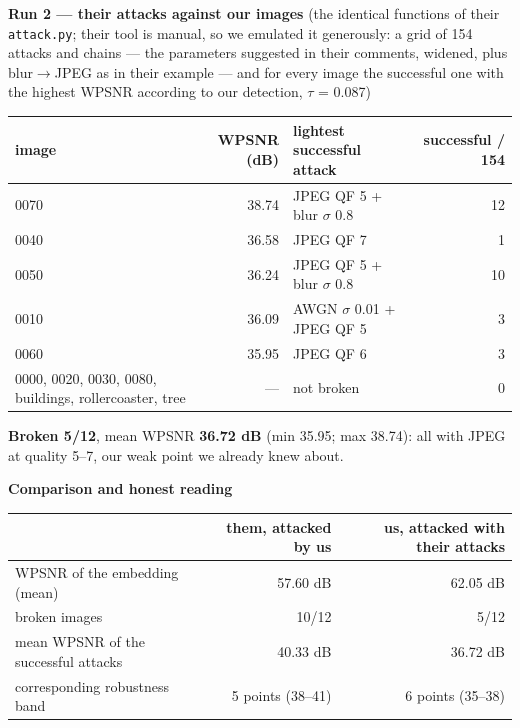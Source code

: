 \documentclass[10pt,a4paper]{article}
\begin{document}
\medskip
\textbf{Run 2 — their attacks against our images} (the identical functions of their \texttt{attack.py}; their tool is manual, so we emulated it generously: a grid of 154 attacks and chains — the parameters suggested in their comments, widened, plus blur$\to$JPEG as in their example — and for every image the successful one with the highest WPSNR according to our detection, $\tau$ = 0.087)

\begin{tabularx}{\linewidth}{@{}l r X r@{}}
\toprule
image & WPSNR (dB) & lightest successful attack & successful / 154 \\
\midrule
0070 & 38.74 & JPEG QF 5 + blur $\sigma$ 0.8 & 12 \\
0040 & 36.58 & JPEG QF 7 & 1 \\
0050 & 36.24 & JPEG QF 5 + blur $\sigma$ 0.8 & 10 \\
0010 & 36.09 & AWGN $\sigma$ 0.01 + JPEG QF 5 & 3 \\
0060 & 35.95 & JPEG QF 6 & 3 \\
0000, 0020, 0030, 0080, buildings, rollercoaster, tree & — & \textcolor{ok}{not broken} & 0 \\
\bottomrule
\end{tabularx}

\textcolor{ko}{\textbf{Broken 5/12}}, mean WPSNR \textbf{36.72 dB} (min 35.95; max 38.74): all with JPEG at quality 5–7, our weak point we already knew about.

\medskip
\textbf{Comparison and honest reading}

\begin{tabularx}{\linewidth}{@{}X r r@{}}
\toprule
 & them, attacked by us & us, attacked with their attacks \\
\midrule
WPSNR of the embedding (mean) & 57.60 dB & 62.05 dB \\
broken images & 10/12 & 5/12 \\
mean WPSNR of the successful attacks & 40.33 dB & 36.72 dB \\
corresponding robustness band & 5 points (38–41) & 6 points (35–38) \\
\bottomrule
\end{tabularx}
\end{document}
